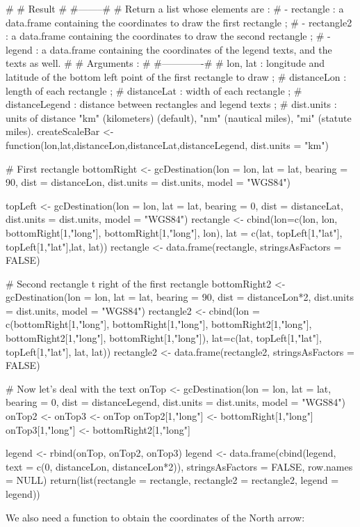 #
# Result #
#--------#
# Return a list whose elements are :
#   - rectangle : a data.frame containing the coordinates to draw the first rectangle ;
#   - rectangle2 : a data.frame containing the coordinates to draw the second rectangle ;
#   - legend : a data.frame containing the coordinates of the legend texts, and the texts as well.
#
# Arguments : #
#-------------#
# lon, lat : longitude and latitude of the bottom left point of the first rectangle to draw ;
# distanceLon : length of each rectangle ;
# distanceLat : width of each rectangle ;
# distanceLegend : distance between rectangles and legend texts ;
# dist.units : units of distance "km" (kilometers) (default), "nm" (nautical miles), "mi" (statute miles).
createScaleBar <- function(lon,lat,distanceLon,distanceLat,distanceLegend, dist.units = "km"){
    # First rectangle
    bottomRight <- gcDestination(lon = lon, lat = lat, bearing = 90, dist = distanceLon, dist.units = dist.units, model = "WGS84")
     
    topLeft <- gcDestination(lon = lon, lat = lat, bearing = 0, dist = distanceLat, dist.units = dist.units, model = "WGS84")
    rectangle <- cbind(lon=c(lon, lon, bottomRight[1,"long"], bottomRight[1,"long"], lon),
    lat = c(lat, topLeft[1,"lat"], topLeft[1,"lat"],lat, lat))
    rectangle <- data.frame(rectangle, stringsAsFactors = FALSE)
     
    # Second rectangle t right of the first rectangle
    bottomRight2 <- gcDestination(lon = lon, lat = lat, bearing = 90, dist = distanceLon*2, dist.units = dist.units, model = "WGS84")
    rectangle2 <- cbind(lon = c(bottomRight[1,"long"], bottomRight[1,"long"], bottomRight2[1,"long"], bottomRight2[1,"long"], bottomRight[1,"long"]),
    lat=c(lat, topLeft[1,"lat"], topLeft[1,"lat"], lat, lat))
    rectangle2 <- data.frame(rectangle2, stringsAsFactors = FALSE)
     
    # Now let's deal with the text
    onTop <- gcDestination(lon = lon, lat = lat, bearing = 0, dist = distanceLegend, dist.units = dist.units, model = "WGS84")
    onTop2 <- onTop3 <- onTop
    onTop2[1,"long"] <- bottomRight[1,"long"]
    onTop3[1,"long"] <- bottomRight2[1,"long"]
     
    legend <- rbind(onTop, onTop2, onTop3)
    legend <- data.frame(cbind(legend, text = c(0, distanceLon, distanceLon*2)), stringsAsFactors = FALSE, row.names = NULL)
    return(list(rectangle = rectangle, rectangle2 = rectangle2, legend = legend))
}
We also need a function to obtain the coordinates of the North arrow:


